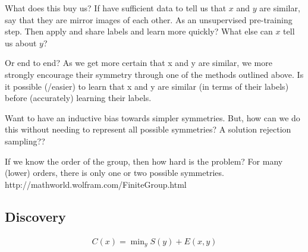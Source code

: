 

What does this buy us? If have sufficient data to tell us that $x$ and $y$ are
similar, say that they are mirror images of each other.
As an unsupervised pre-training step. Then apply and share labels and learn more quickly?
What else can $x$ tell us about $y$?

\cite{Yang2019}

Or end to end? As we get more certain that x and y are similar, we more strongly
encourage their symmetry through one of the methods outlined above.
Is it possible (/easier) to learn that x and y are similar (in terms of their labels) before (accurately) learning their labels.



Want to have an inductive bias towards simpler symmetries. But, how can we do this without needing to represent all possible symmetries?
A solution rejection sampling??





If we know the order of the group, then how hard is the problem?
For many (lower) orders, there is only one or two possible symmetries. http://mathworld.wolfram.com/FiniteGroup.html


\subsection{Discovery}

\begin{align*}
C(x) = \mathop{\text{min}}_y S(y) + E(x, y)
\end{align*}


